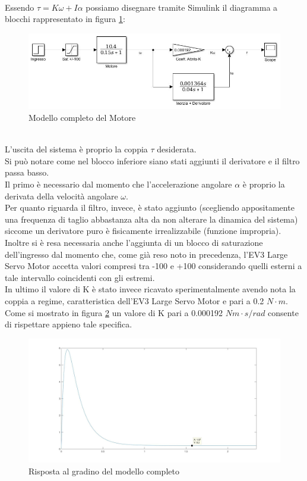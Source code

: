 \\Essendo $\tau=K\omega+I\alpha$ possiamo disegnare tramite Simulink il diagramma a blocchi rappresentato in figura \ref{modMotoreTorque}:
\begin{figure}[ht]
	\centering
	\includegraphics[width=\textwidth]{modMotoreTorque.jpg}
	\caption{Modello completo del Motore}
	\label{modMotoreTorque}
\end{figure}
\\L'uscita del sistema è proprio la coppia $\tau$ desiderata.\\
Si può notare come nel blocco inferiore siano stati aggiunti il derivatore e il filtro passa basso.\\
Il primo è necessario dal momento che l'accelerazione angolare $\alpha$ è proprio la derivata della velocità angolare $\omega$.\\
Per quanto riguarda il filtro, invece, è stato aggiunto (scegliendo appositamente una frequenza di taglio abbastanza alta da non alterare la dinamica del sistema) siccome un derivatore puro è fisicamente irrealizzabile (funzione impropria).\\
Inoltre si è resa necessaria anche l'aggiunta di un blocco di saturazione dell'ingresso dal momento che, come già reso noto in precedenza, l'EV3 Large Servo Motor accetta valori compresi tra -100 e +100 considerando quelli esterni a tale intervallo coincidenti con gli estremi.\\
In ultimo il valore di K è stato invece ricavato sperimentalmente avendo nota la coppia a regime, caratteristica dell'EV3 Large Servo Motor e pari a 0.2 $N\cdot m$.\\
Come si mostrato in figura \ref{torque02} un valore di K pari a 0.000192 $Nm\cdot s/rad$ consente di rispettare appieno tale specifica.
\begin{figure}[ht]
	\centering
	\includegraphics[width=\textwidth]{torque02.jpg}
	\caption{Risposta al gradino del modello completo}
	\label{torque02}
\end{figure}
